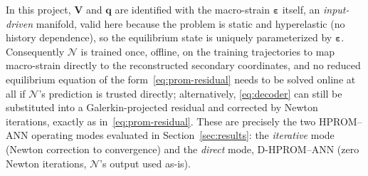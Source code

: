 \documentclass[10pt,a4paper]{article}
\begin{document}
In this project, $\mathbf V$ and $\bm q$ are identified with the
macro-strain $\bm\varepsilon$ itself, an \emph{input-driven} manifold, valid here
because the problem is static and hyperelastic (no history dependence), so
the equilibrium state is uniquely parameterized by $\bm\varepsilon$. Consequently
$\mathcal N$ is trained once, offline, on the training trajectories to map
macro-strain directly to the reconstructed secondary coordinates, and no
reduced equilibrium equation of the form~\eqref{eq:prom-residual} needs to
be solved online at all if $\mathcal N$'s prediction is trusted directly;
alternatively, \eqref{eq:decoder} can still be substituted into a
Galerkin-projected residual and corrected by Newton iterations, exactly as
in~\eqref{eq:prom-residual}. These are precisely the two HPROM--ANN
operating modes evaluated in Section~\ref{sec:results}: the
\emph{iterative} mode (Newton correction to convergence) and the
\emph{direct} mode, D-HPROM--ANN (zero Newton iterations, $\mathcal N$'s
output used as-is).
\end{document}
